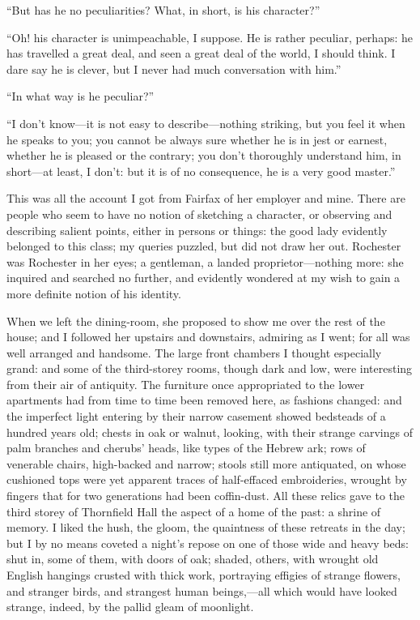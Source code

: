 \enquote{But has he no peculiarities? What, in short, is his
character?}

\enquote{Oh! his character is unimpeachable, I suppose. He is rather
peculiar, perhaps: he has travelled a great deal, and seen a great deal
of the world, I should think. I dare say he is clever, but I never had
much conversation with him.}

\enquote{In what way is he peculiar?}

\enquote{I don't know---it is not easy to describe---nothing striking,
but you feel it when he speaks to you; you cannot be always sure whether
he is in jest or earnest, whether he is pleased or the contrary; you
don't thoroughly understand him, in short---at least, I don't: but it is
of no consequence, he is a very good master.}

This was all the account I got from \Mrs{} Fairfax of her employer and
mine. There are people who seem to have no notion of sketching a
character, or observing and describing salient points, either in persons
or things: the good lady evidently belonged to this class; my queries
puzzled, but did not draw her out. \Mr{} Rochester was \Mr{} Rochester in
her eyes; a gentleman, a landed proprietor---nothing more: she inquired
and searched no further, and evidently wondered at my wish to gain a
more definite notion of his identity.

When we left the dining-room, she proposed to show me over the rest of
the house; and I followed her upstairs and downstairs, admiring as I
went; for all was well arranged and handsome. The large front chambers
I thought especially grand: and some of the third-storey rooms, though
dark and low, were interesting from their air of antiquity. The
furniture once appropriated to the lower apartments had from time to
time been removed here, as fashions changed: and the imperfect light
entering by their narrow casement showed bedsteads of a hundred years
old; chests in oak or walnut, looking, with their strange carvings of
palm branches and cherubs' heads, like types of the Hebrew ark; rows of
venerable chairs, high-backed and narrow; stools still more antiquated,
on whose cushioned tops were yet apparent traces of half-effaced
embroideries, wrought by fingers that for two generations had been
coffin-dust. All these relics gave to the third storey of Thornfield
Hall the aspect of a home of the past: a shrine of memory. I liked the
hush, the gloom, the quaintness of these retreats in the day; but I by
no means coveted a night's repose on one of those wide and heavy beds:
shut in, some of them, with doors of oak; shaded, others, with wrought
old English hangings crusted with thick work, portraying effigies of
strange flowers, and stranger birds, and strangest human beings,---all
which would have looked strange, indeed, by the pallid gleam of
moonlight.

